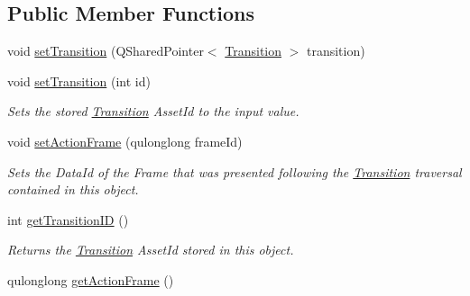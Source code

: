 \subsection*{Public Member Functions}
\begin{DoxyCompactItemize}
\item 
void \hyperlink{class_picto_1_1_state_data_unit_af4507c50ef7cde2ea05cc58e9507c212}{set\-Transition} (Q\-Shared\-Pointer$<$ \hyperlink{class_picto_1_1_transition}{Transition} $>$ transition)
\item 
\hypertarget{class_picto_1_1_state_data_unit_a1a415de9c6d48637f1396db82e429b2f}{void \hyperlink{class_picto_1_1_state_data_unit_a1a415de9c6d48637f1396db82e429b2f}{set\-Transition} (int id)}\label{class_picto_1_1_state_data_unit_a1a415de9c6d48637f1396db82e429b2f}

\begin{DoxyCompactList}\small\item\em Sets the stored \hyperlink{class_picto_1_1_transition}{Transition} Asset\-Id to the input value. \end{DoxyCompactList}\item 
\hypertarget{class_picto_1_1_state_data_unit_a7dfef0433d0ee1d1b88bcaf9ee6e089e}{void \hyperlink{class_picto_1_1_state_data_unit_a7dfef0433d0ee1d1b88bcaf9ee6e089e}{set\-Action\-Frame} (qulonglong frame\-Id)}\label{class_picto_1_1_state_data_unit_a7dfef0433d0ee1d1b88bcaf9ee6e089e}

\begin{DoxyCompactList}\small\item\em Sets the Data\-Id of the Frame that was presented following the \hyperlink{class_picto_1_1_transition}{Transition} traversal contained in this object. \end{DoxyCompactList}\item 
\hypertarget{class_picto_1_1_state_data_unit_a26f4b31dd0c9a1a80f0533276b720458}{int \hyperlink{class_picto_1_1_state_data_unit_a26f4b31dd0c9a1a80f0533276b720458}{get\-Transition\-I\-D} ()}\label{class_picto_1_1_state_data_unit_a26f4b31dd0c9a1a80f0533276b720458}

\begin{DoxyCompactList}\small\item\em Returns the \hyperlink{class_picto_1_1_transition}{Transition} Asset\-Id stored in this object. \end{DoxyCompactList}\item 
\hypertarget{class_picto_1_1_state_data_unit_a6f9100324c96f9408c9650e100d2d178}{qulonglong \hyperlink{class_picto_1_1_state_data_unit_a6f9100324c96f9408c9650e100d2d178}{get\-Action\-Frame} ()}\label{class_picto_1_1_state_data_unit_a6f9100324c96f9408c9650e100d2d178}


\end{DoxyCompactItemize}
